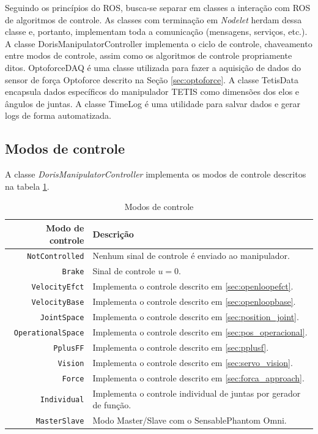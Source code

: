Seguindo os princípios do ROS, busca-se separar em classes a interação com ROS de algoritmos de controle. As classes com terminação em \textit{Nodelet} herdam dessa classe e, portanto, implementam toda a comunicação (mensagens, serviços, etc.). A classe DorisManipulatorController implementa o ciclo de controle, chaveamento entre modos de controle, assim como os algoritmos de controle propriamente ditos. OptoforceDAQ é uma classe utilizada para fazer a aquisição de dados do sensor de força Optoforce descrito na Seção \ref{sec:optoforce}. A classe TetisData encapsula dados específicos do manipulador TETIS como dimensões dos elos e ângulos de juntas. A classe TimeLog é uma utilidade para salvar dados e gerar logs de forma automatizada. 

\subsection{Modos de controle} \label{sec:ctrlmodes}

A classe \textit{DorisManipulatorController} implementa os modos de controle descritos na tabela \ref{tab:control_modes}. 


\begin{table}[h!]
\centering
\caption{Modos de controle}
\label{tab:control_modes}
\begin{tabular}{rl} \hline
Modo de controle      	& Descrição \\ \hline
\verb|NotControlled|  	& Nenhum sinal de controle é enviado ao manipulador.\\
\verb|Brake|			& Sinal de controle $u = 0$. \\
\verb|VelocityEfct|		& Implementa o controle descrito em \ref{sec:openloopefct}. \\
\verb|VelocityBase|		& Implementa o controle descrito em \ref{sec:openloopbase}. \\
\verb|JointSpace|		& Implementa o controle descrito em \ref{sec:position_joint}. \\
\verb|OperationalSpace| & Implementa o controle descrito em \ref{sec:pos_operacional}. \\
\verb|PplusFF|			& Implementa o controle descrito em \ref{sec:pplusf}. \\
\verb|Vision|			& Implementa o controle descrito em \ref{sec:servo_vision}. \\
\verb|Force|			& Implementa o controle descrito em \ref{sec:forca_approach}. \\
\verb|Individual|		& Implementa o controle individual de juntas por gerador de função. \\
\verb|MasterSlave|		& Modo Master/Slave com o Sensable\circledR Phantom Omni. \\
\hline
\end{tabular}
\end{table}

